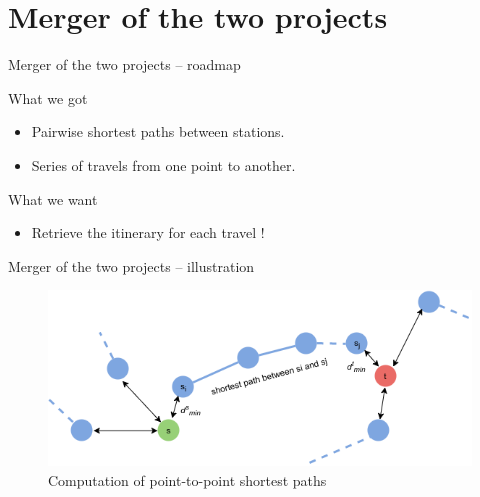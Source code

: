 \section{Merger of the two projects}

\begin{frame}{Merger of the two projects -- roadmap}
	\begin{block}{What we got}
		\begin{itemize}
			\item Pairwise shortest paths between stations.
			\item Series of travels from one point to another.
		\end{itemize}
	\end{block}
	\begin{alertblock}{What we want}
		\begin{itemize}
			\item Retrieve the itinerary for each travel !
		\end{itemize}
	\end{alertblock}
\end{frame}

\begin{frame}{Merger of the two projects -- illustration}
	\begin{figure}
		\centering
		\includegraphics[width=\linewidth]{images/shortest_path.png}
		\caption{Computation of point-to-point shortest paths}
	\end{figure}
\end{frame}